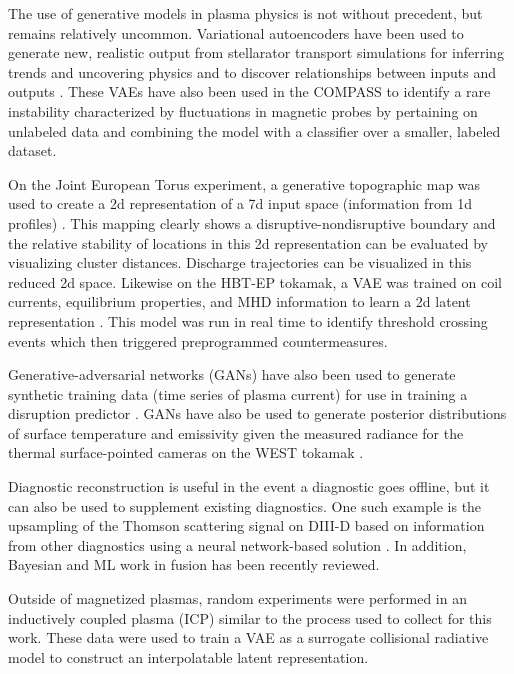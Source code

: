 The use of generative models in plasma physics is not without precedent, but remains relatively uncommon. Variational autoencoders \cite{kingma_auto-encoding_2022} have been used to generate new, realistic output from stellarator transport simulations for inferring trends and uncovering physics \cite{lennart_van_rijn_minimizing_2022} and to discover relationships between inputs and outputs \cite{vos_discovery_2024}. These VAEs have also been used in the COMPASS to identify a rare instability characterized by fluctuations in magnetic probes \cite{skvara_detection_2020} by pertaining on unlabeled data and combining the model with a classifier over a smaller, labeled dataset. 

On the Joint European Torus experiment, a generative topographic map was used to create a 2d representation of a 7d input space (information from 1d profiles) \cite{pau_machine_2019}. This mapping clearly shows a disruptive-nondisruptive boundary and the relative stability of locations in this 2d representation can be evaluated by visualizing cluster distances. Discharge trajectories can be visualized in this reduced 2d space. Likewise on the HBT-EP tokamak, a VAE was trained on coil currents, equilibrium properties, and MHD information to learn a 2d latent representation \cite{wei_dimensionality_2021}. This model was run in real time to identify threshold crossing events which then triggered preprogrammed countermeasures. 

Generative-adversarial networks (GANs) \cite{goodfellow_generative_2014} have also been used to generate synthetic training data (time series of plasma current) for use in training a disruption predictor \cite{dave_synthetic_2023}. GANs have also be used to generate posterior distributions of surface temperature and emissivity given the measured radiance for the thermal surface-pointed cameras on the WEST tokamak \cite{juven_generative_2024}. 

Diagnostic reconstruction is useful in the event a diagnostic goes offline, but it can also be used to supplement existing diagnostics.  One such example is the upsampling of the Thomson scattering signal on DIII-D based on information from other diagnostics using a neural network-based solution \cite{jalalvand_multimodal_2024}. In addition, Bayesian and ML work in fusion has been recently reviewed\cite{pavone_machine_2023}.

Outside of magnetized plasmas, random experiments were performed in an inductively coupled plasma (ICP) similar to the process used to collect for this work. These data were used to train a VAE as a surrogate collisional radiative model \cite{daly_data-driven_2023} to construct an interpolatable latent representation.

